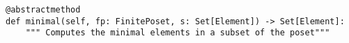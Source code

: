 \begin{verbatim}
@abstractmethod
def minimal(self, fp: FinitePoset, s: Set[Element]) -> Set[Element]:
    """ Computes the minimal elements in a subset of the poset"""
\end{verbatim}